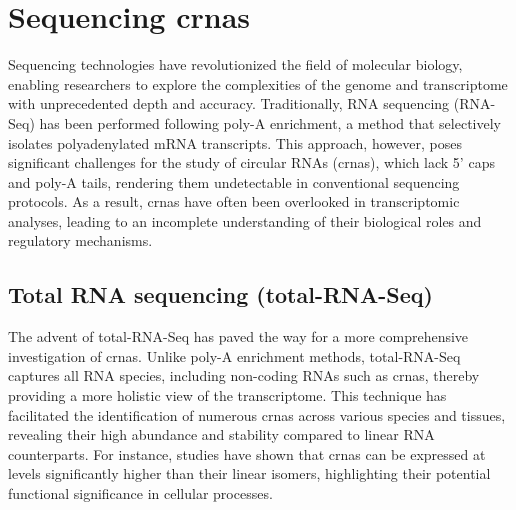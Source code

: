 \section{Sequencing \gls{crna}s}

Sequencing technologies have revolutionized the field of molecular biology,
enabling researchers to explore the complexities of the genome and
transcriptome with unprecedented depth and accuracy.
Traditionally, RNA sequencing (RNA-Seq) has been performed following poly-A
enrichment, a method that selectively isolates polyadenylated mRNA transcripts.
This approach, however, poses significant challenges for the study of circular
RNAs (\gls{crna}s), which lack 5' caps and poly-A tails, rendering them
undetectable in conventional sequencing protocols\supercite{guo_expanded_2014}.
As a result, \gls{crna}s have often been overlooked in transcriptomic analyses,
leading to an incomplete understanding of their biological roles and regulatory
mechanisms.

\subsection{Total RNA sequencing (total-RNA-Seq)}
The advent of total-RNA-Seq has paved the way for a more comprehensive
investigation of \gls{crna}s.
Unlike poly-A enrichment methods, total-RNA-Seq captures all RNA species,
including non-coding RNAs such as \gls{crna}s, thereby providing a more
holistic view of the transcriptome\supercite{panda_identification_2017}.
This technique has facilitated the identification of numerous \gls{crna}s
across various species and tissues, revealing their high abundance and
stability compared to linear RNA
counterparts\supercite{liu_circular_2016,cao_expression_2018}.
For instance, studies have shown that \gls{crna}s can be expressed at levels
significantly higher than their linear isomers, highlighting their potential
functional significance in cellular processes\supercite{liu_circular_2016}.
